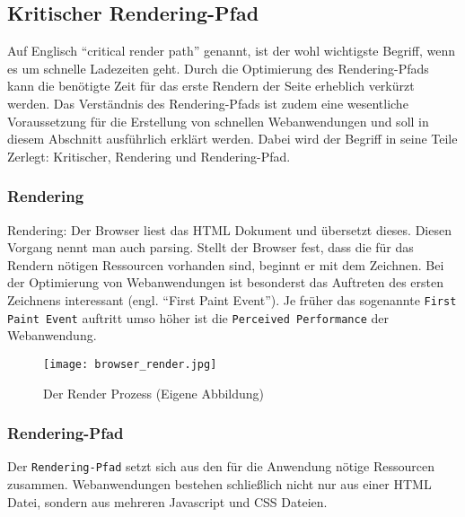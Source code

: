 	\pagebreak



	\subsection{Kritischer Rendering-Pfad} %
	\label{sub:critical_render_path}
		Auf Englisch "`critical render path"' genannt, ist der wohl wichtigste Begriff, wenn es um schnelle Ladezeiten geht. Durch die Optimierung des Rendering-Pfads kann die benötigte Zeit für das erste Rendern der Seite erheblich verkürzt werden. Das Verständnis des Rendering-Pfads ist zudem eine wesentliche Voraussetzung für die Erstellung von schnellen Webanwendungen und soll in diesem Abschnitt ausführlich erklärt werden. Dabei wird der Begriff in seine Teile Zerlegt: Kritischer, Rendering und Rendering-Pfad.\\

		\subsubsection{Rendering} %
		\label{ssub:rendering}
			

			Rendering: Der Browser liest das HTML Dokument und übersetzt dieses. Diesen Vorgang nennt man auch parsing. Stellt der Browser fest, dass die für das Rendern nötigen Ressourcen vorhanden sind, beginnt er mit dem Zeichnen. Bei der Optimierung von Webanwendungen ist besonderst das Auftreten des ersten Zeichnens interessant (engl. "`First Paint Event"'). Je früher das sogenannte \texttt{First Paint Event} auftritt umso höher ist die \texttt{Perceived Performance} der Webanwendung. 

			\begin{figure}[htbp]
				\begin{center}
					\texttt{[image: browser\_render.jpg]}
					\caption{Der Render Prozess (Eigene Abbildung)}
					\label{fig:browser_render}
				\end{center}
			\end{figure}


		\subsubsection{Rendering-Pfad} %
		\label{ssub:rendering_pfad}

			Der \texttt{Rendering-Pfad} setzt sich aus den für die Anwendung nötige Ressourcen zusammen. Webanwendungen bestehen schließlich nicht nur aus einer HTML Datei, sondern aus mehreren Javascript und CSS Dateien.

